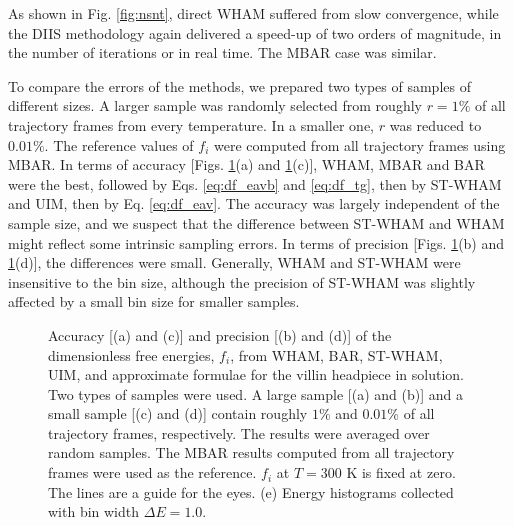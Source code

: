 \documentclass{gMOS2e}
\begin{document}
As shown in Fig. \ref{fig:nsnt},
direct WHAM suffered from slow convergence,
while the DIIS methodology again
delivered a speed-up of two orders of magnitude,
in the number of iterations or in real time.
%
The MBAR case was similar.
%



To compare the errors of the methods,
we prepared two types of samples of different sizes.
%
A larger sample was randomly selected from roughly $r = 1\%$
of all trajectory frames from every temperature.
%
In a smaller one, $r$ was reduced to $0.01\%$.
%
The reference values of $f_i$
were computed from all trajectory frames using MBAR.
%
In terms of accuracy
[Figs. \ref{fig:whamcmp}(a) and \ref{fig:whamcmp}(c)],
WHAM, MBAR and BAR were the best,
followed by Eqs. \eqref{eq:df_eavb} and \eqref{eq:df_tg},
then by ST-WHAM and UIM,
then by Eq. \eqref{eq:df_eav}.
%
The accuracy was largely independent of the sample size,
and we suspect that the difference
between ST-WHAM and WHAM
might reflect some intrinsic sampling errors.
%
%
In terms of precision
[Figs. \ref{fig:whamcmp}(b) and \ref{fig:whamcmp}(d)],
the differences were small.
%
%
Generally,
WHAM and ST-WHAM were insensitive to the bin size,
although the precision of ST-WHAM was slightly affected
by a small bin size for smaller samples.



\begin{figure}[h]
\begin{center}
  \caption{
    \label{fig:whamcmp}
    Accuracy [(a) and (c)] and precision [(b) and (d)] of
    the dimensionless free energies, $f_i$,
    from WHAM, BAR, ST-WHAM, UIM, and approximate formulae
    for the villin headpiece in solution.
    Two types of samples were used.
    A large sample [(a) and (b)]
    and
    a small sample [(c) and (d)]
    contain roughly
    $1\%$ and $0.01\%$ of all trajectory frames,
    respectively.
    The results were averaged over random samples.
    The MBAR results computed from all trajectory frames
    were used as the reference.
    $f_i$ at $T = 300$ K is fixed at zero.
    The lines are a guide for the eyes.
    (e) Energy histograms collected
    with bin width $\Delta E = 1.0$.
  }
\end{center}
\end{figure}
\end{document}
